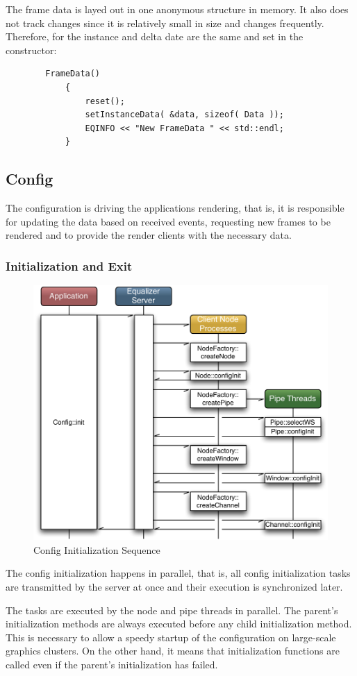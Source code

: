\documentclass[10pt,a4]{scrartcl}
\begin{document}
The frame data is layed out in one anonymous structure in
memory. It also does not track changes since it is relatively small in
size and changes frequently. Therefore, for the instance and delta
date are the same and set in the constructor:

{\footnotesize\begin{lstlisting}
        FrameData()
            {
                reset();
                setInstanceData( &data, sizeof( Data ));
                EQINFO << "New FrameData " << std::endl;
            }
\end{lstlisting}}%

\subsection{Config}

The configuration is driving the applications rendering, that is, it is
responsible for updating the data based on received events, requesting
new frames to be rendered and to provide the render clients with the
necessary data.

\subsubsection{Initialization and Exit}

\begin{figure}
  \includegraphics[width=.6\textwidth]{images/configInit.pdf}
  {\caption{\small\label{fConfigInit}Config Initialization Sequence}}
\end{figure}
The config initialization happens in parallel, that is, all config
initialization tasks are transmitted by the server at once and their
execution is synchronized later. 

The tasks are executed by the node and pipe threads in parallel. The
parent's initialization methods are always executed before any child
initialization method. This is necessary to allow a speedy startup of
the configuration on large-scale graphics clusters. On the other hand,
it means that initialization functions are called even if the parent's
initialization has failed.
\end{document}
